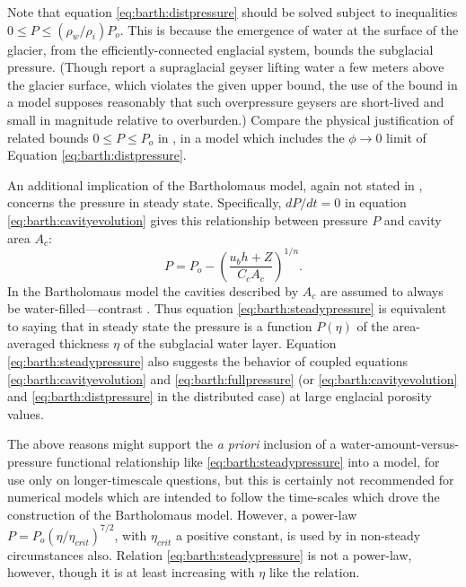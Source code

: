 \documentclass[twocolumn]{igs}
\begin{document}
Note that equation \eqref{eq:barth:distpressure} should be solved subject to inequalities $0 \le P \le (\rho_w/\rho_i) P_o$.  This is because the emergence of water at the surface of the glacier, from the efficiently-connected englacial system, bounds the subglacial pressure.  (Though \cite{Bartholomausetal2011} report a supraglacial geyser lifting water a few meters above the glacier surface, which violates the given upper bound, the use of the bound in a model supposes reasonably that such overpressure geysers are short-lived and small in magnitude relative to overburden.)  Compare the physical justification of related bounds $0 \le P \le P_o$ in \cite{Schoofetal2012}, in a model which includes the $\phi\to 0$ limit of Equation \eqref{eq:barth:distpressure}.

An additional implication of the Bartholomaus model, again not stated in \cite{Bartholomausetal2011}, concerns the pressure in steady state.  Specifically, $dP/dt=0$ in equation \eqref{eq:barth:cavityevolution} gives this relationship between pressure $P$ and cavity area $A_c$:
\begin{equation}
P = P_o - \left(\frac{u_b h + Z}{C_c A_c}\right)^{1/n}. \label{eq:barth:steadypressure}
\end{equation}
In the Bartholomaus model the cavities described by $A_c$ are assumed to always be water-filled---contrast \citep{Schoofetal2012}.  Thus equation \eqref{eq:barth:steadypressure} is equivalent to saying that in steady state the pressure is a function $P(\eta)$ of the area-averaged thickness $\eta$ of the subglacial water layer. Equation \eqref{eq:barth:steadypressure} also suggests the behavior of coupled equations \eqref{eq:barth:cavityevolution} and \eqref{eq:barth:fullpressure} (or \eqref{eq:barth:cavityevolution} and \eqref{eq:barth:distpressure} in the distributed case) at large englacial porosity values.

The above reasons might support the \emph{a priori} inclusion of a water-amount-versus-pressure functional relationship like \eqref{eq:barth:steadypressure} into a model, for use only on longer-timescale questions, but this is certainly not recommended for numerical models which are intended to follow the time-scales which drove the construction of the Bartholomaus model.  However, a power-law $P = P_o (\eta/\eta_{crit})^{7/2}$, with $\eta_{crit}$ a positive constant, is used by \cite{FlowersClarke2002_theory} in non-steady circumstances also.  Relation \eqref{eq:barth:steadypressure} is not a power-law, however, though it is at least increasing with $\eta$ like the \cite{FlowersClarke2002_theory} relation.
\end{document}
